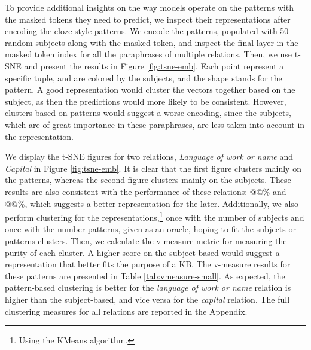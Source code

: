 To provide additional insights on the way models operate on the patterns with the masked tokens they need to predict, we inspect their representations after encoding the cloze-style patterns.
We encode the patterns, populated with 50 random subjects along with the masked token, and inspect the final layer in the masked token index for all the paraphrases of multiple relations.
Then, we use t-SNE \cite{tsne} and present the results in Figure \ref{fig:tsne-emb}.
Each point represent a specific tuple, and are colored by the subjects, and the shape stands for the pattern.
A good representation would cluster the vectors together based on the subject, as then the predictions would more likely to be consistent. However, clusters based on patterns would suggest a worse encoding, since the subjects, which are of great importance in these paraphrases, are less taken into account in the representation.

We display the t-SNE figures for two relations, \textit{Language  of work or name} and \textit{Capital} in Figure \ref{fig:tsne-emb}.
It is clear that the first figure clusters mainly on the patterns, whereas the second figure clusters mainly on the subjects. These results are also consistent with the performance of these relations: @@\% and @@\%, which suggests a better representation for the later.
Additionally, we also perform clustering for the representations,\footnote{Using the KMeans algorithm.} once with the number of subjects and once with the number patterns, given as an oracle, hoping to fit the subjects or patterns clusters. Then, we calculate the v-measure metric for measuring the purity of each cluster.
A higher score on the subject-based would suggest a representation that better fits the purpose of a KB.
The v-measure results for these patterns are presented in Table \ref{tab:vmeasure-small}.
As expected, the pattern-based clustering is better for the \textit{language of work or name} relation is higher than the subject-based, and vice versa for the \textit{capital} relation.
The full clustering measures for all relations are reported in the Appendix.

